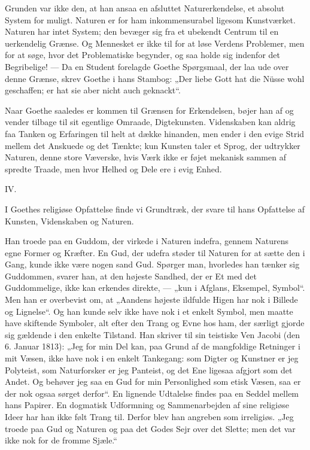\documentclass[12pt,a4paper,openany]{book}
\newcommand{\opage}[1]{\marginnote{\footnotesize\textit{[#1]}}}
\begin{document}
Grunden var ikke den, at han ansaa en afsluttet Naturerkendelse,
et absolut System for muligt. Naturen er for ham
inkommensurabel ligesom Kunstværket. Naturen har intet System;
den bevæger sig fra et ubekendt Centrum til en uerkendelig
Grænse. Og Mennesket er ikke til for at løse Verdens
Problemer, men for at søge, hvor det Problematiske begynder,
og saa holde sig indenfor det Begribelige! --- Da en Student
forelagde Goethe Spørgsmaal, der laa ude over denne Grænse,
skrev Goethe i hans Stambog: „Der liebe Gott hat die Nüsse
wohl geschaffen; er hat sie aber nicht auch geknackt“.

Naar Goethe saaledes er kommen til Grænsen for Erkendelsen,
bøjer han af og vender tilbage til sit egentlige Omraade,
Digtekunsten. Videnskaben kan aldrig faa Tanken og
Erfaringen til helt at dække hinanden, men ender i den evige
Strid mellem det Anskuede og det Tænkte; kun Kunsten taler
et Sprog, der udtrykker Naturen, denne store Væverske, hvis
Værk ikke er føjet mekanisk sammen af spredte Traade, men
hvor Helhed og Dele ere i evig Enhed.

\begin{center}IV.\end{center}


I Goethes religiøse Opfattelse finde vi Grundtræk, der
svare til hans Opfattelse af Kunsten, Videnskaben og Naturen.


\setcounter{footnote}{0}%
\opage{173}Han troede paa en Guddom, der virkede i Naturen indefra,
gennem Naturens egne Former og Kræfter. En Gud, der
udefra støder til Naturen for at sætte den i Gang, kunde ikke
være nogen sand Gud. Spørger man, hvorledes han tænker
sig Guddommen, svarer han, at den højeste Sandhed, der er
Et med det Guddommelige, ikke kan erkendes direkte, --- „kun
i Afglans, Eksempel, Symbol“. Men han er overbevist om, at
„Aandens højeste ildfulde Higen har nok i Billede og Lignelse“.
Og han kunde selv ikke have nok i et enkelt Symbol, men
maatte have skiftende Symboler, alt efter den Trang og Evne
hos ham, der særligt gjorde sig gældende i den enkelte Tilstand.
Han skriver til sin teistiske Ven Jacobi (den 6. Januar
1813): „Jeg for min Del kan, paa Grund af de mangfoldige
Retninger i mit Væsen, ikke have nok i en enkelt Tankegang:
som Digter og Kunstner er jeg Polyteist, som Naturforsker er
jeg Panteist, og det Ene ligesaa afgjort som det Andet. Og behøver
jeg saa en Gud for min Personlighed som etisk Væsen,
saa er der nok ogsaa sørget derfor“. En lignende Udtalelse
findes paa en Seddel mellem hans Papirer. En dogmatisk Udformning
og Sammenarbejden af sine religiøse Ideer har han
ikke følt Trang til. Derfor blev han angreben som irreligiøs.
„Jeg troede paa Gud og Naturen og paa det Godes Sejr over
det Slette; men det var ikke nok for de fromme Sjæle.“
\end{document}
